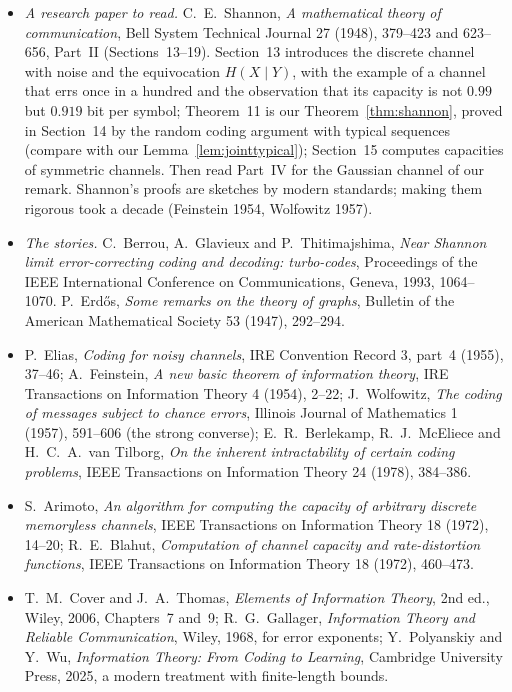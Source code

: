 \begin{itemize}
\item \emph{A research paper to read.} C.~E.~Shannon, \emph{A mathematical theory of communication}, Bell System Technical Journal 27 (1948), 379--423 and 623--656, Part~II (Sections~13--19). Section~13 introduces the discrete channel with noise and the equivocation $H(X\mid Y)$, with the example of a channel that errs once in a hundred and the observation that its capacity is not $0.99$ but $0.919$ bit per symbol; Theorem~11 is our Theorem~\ref{thm:shannon}, proved in Section~14 by the random coding argument with typical sequences (compare with our Lemma~\ref{lem:jointtypical}); Section~15 computes capacities of symmetric channels. Then read Part~IV for the Gaussian channel of our remark. Shannon's proofs are sketches by modern standards; making them rigorous took a decade (Feinstein 1954, Wolfowitz 1957).
\item \emph{The stories.} C.~Berrou, A.~Glavieux and P.~Thitimajshima, \emph{Near Shannon limit error-correcting coding and decoding: turbo-codes}, Proceedings of the IEEE International Conference on Communications, Geneva, 1993, 1064--1070. P.~Erd\H{o}s, \emph{Some remarks on the theory of graphs}, Bulletin of the American Mathematical Society 53 (1947), 292--294.
\item P.~Elias, \emph{Coding for noisy channels}, IRE Convention Record 3, part~4 (1955), 37--46; A.~Feinstein, \emph{A new basic theorem of information theory}, IRE Transactions on Information Theory 4 (1954), 2--22; J.~Wolfowitz, \emph{The coding of messages subject to chance errors}, Illinois Journal of Mathematics 1 (1957), 591--606 (the strong converse); E.~R.~Berlekamp, R.~J.~McEliece and H.~C.~A.~van Tilborg, \emph{On the inherent intractability of certain coding problems}, IEEE Transactions on Information Theory 24 (1978), 384--386.
\item S.~Arimoto, \emph{An algorithm for computing the capacity of arbitrary discrete memoryless channels}, IEEE Transactions on Information Theory 18 (1972), 14--20; R.~E.~Blahut, \emph{Computation of channel capacity and rate-distortion functions}, IEEE Transactions on Information Theory 18 (1972), 460--473.
\item T.~M.~Cover and J.~A.~Thomas, \emph{Elements of Information Theory}, 2nd ed., Wiley, 2006, Chapters~7 and~9; R.~G.~Gallager, \emph{Information Theory and Reliable Communication}, Wiley, 1968, for error exponents; Y.~Polyanskiy and Y.~Wu, \emph{Information Theory: From Coding to Learning}, Cambridge University Press, 2025, a modern treatment with finite-length bounds.
\end{itemize}
